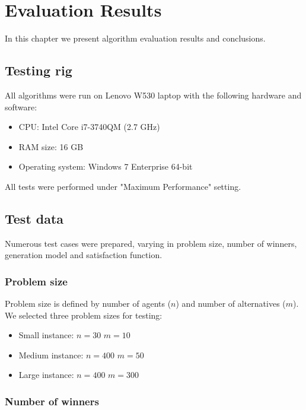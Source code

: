 \chapter{Evaluation Results}
\label{cha:evaluationResults}

In this chapter we present algorithm evaluation results and conclusions.

\section{Testing rig}

All algorithms were run on Lenovo W530 laptop with the following hardware and software:

\begin{itemize}
	\item CPU: Intel Core i7-3740QM (2.7 GHz)
	\item RAM size: 16 GB
	\item Operating system: Windows 7 Enterprise 64-bit
\end{itemize}

All tests were performed under "Maximum Performance" setting.

\section{Test data}

Numerous test cases were prepared, varying in problem size, number of winners, generation model and satisfaction function.

\subsection{Problem size}

Problem size is defined by number of agents ($n$) and number of alternatives ($m$). We selected three problem sizes for testing:

\begin{itemize}
	\item Small instance: $n = 30$ $m = 10$
	\item Medium instance: $n = 400$ $m = 50$
	\item Large instance: $n = 400$ $m = 300$
\end{itemize}

\subsection{Number of winners}

